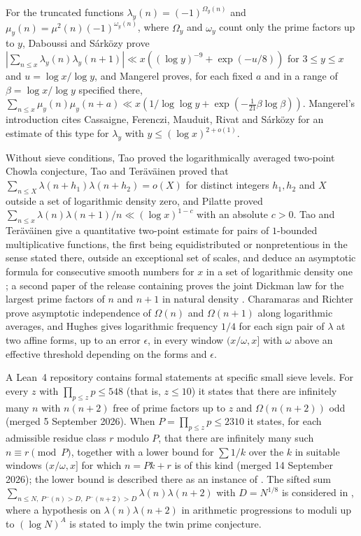 \documentclass[11pt]{article}
\theoremstyle{definition}
\theoremstyle{remark}
\numberwithin{equation}{section}
\begin{document}
For the truncated functions $\lambda_y(n)=(-1)^{\Omega_y(n)}$ and $\mu_y(n)=\mu^2(n)(-1)^{\omega_y(n)}$, where
$\Omega_y$ and $\omega_y$ count only the prime factors up to $y$, Daboussi and S\'ark\"ozy
\cite[Corollary~2]{DaboussiSarkozy2003} prove
$|\sum_{n\le x}\lambda_y(n)\lambda_y(n+1)|\ll x((\log y)^{-9}+\exp(-u/8))$ for $3\le y\le x$ and $u=\log x/\log y$,
and Mangerel \cite[Theorem~1.2(a)]{Mangerel2017} proves, for each fixed $a$ and in a range of
$\beta=\log x/\log y$ specified there,
$\sum_{n\le x}\mu_y(n)\mu_y(n+a)\ll x(1/\log\log y+\exp(-\tfrac1{21}\beta\log\beta))$. Mangerel's introduction
cites Cassaigne, Ferenczi, Mauduit, Rivat
and S\'ark\"ozy \cite{CFMRS1999} for an estimate of this type for $\lambda_y$ with $y\le(\log x)^{2+o(1)}$.

Without sieve conditions, Tao \cite[Theorem~1.2]{Tao2016} proved the logarithmically averaged two-point Chowla
conjecture, Tao and Ter\"av\"ainen \cite[Corollary~1.14]{TaoTeravainen2019} proved that
$\sum_{n\le X}\lambda(n+h_1)\lambda(n+h_2)=o(X)$ for distinct integers $h_1,h_2$ and $X$ outside a set of logarithmic density zero, and Pilatte
\cite[Theorem~1.1]{Pilatte2023} proved $\sum_{n\le x}\lambda(n)\lambda(n+1)/n\ll(\log x)^{1-c}$ with an absolute
$c>0$. Tao and Ter\"av\"ainen \cite[Theorem~3.1]{TaoTeravainen2025} give a quantitative two-point estimate for
pairs of $1$-bounded multiplicative functions, the first being equidistributed or nonpretentious in the sense stated there, outside an exceptional set of scales, and deduce an asymptotic formula for
consecutive smooth numbers for $x$ in a set of logarithmic density one \cite[Theorem~1.8]{TaoTeravainen2025}; a second paper of the release
containing \cite{OpenAI007} proves the joint Dickman law for the largest prime factors of $n$ and $n+1$ in natural density
\cite[Theorem~1.1]{OpenAI012}. Charamaras and Richter \cite[Theorem~A]{CharamarasRichter2024} prove asymptotic
independence of $\Omega(n)$ and $\Omega(n+1)$ along logarithmic averages, and Hughes
\cite[Corollary~7.1]{Hughes2026} gives logarithmic frequency $1/4$ for each sign pair of $\lambda$ at two affine
forms, up to an error $\epsilon$, in every window $(x/\omega,x]$ with $\omega$ above an effective threshold depending on the forms and $\epsilon$.

A Lean~4 repository \cite{JyhSalt2026} contains formal statements at specific small sieve levels. For every $z$
with $\prod_{p\le z}p\le548$ (that is, $z\le10$) it states that there are infinitely many $n$ with $n(n+2)$ free of
prime factors up to $z$ and $\Omega(n(n+2))$ odd (merged 5 September 2026). When $P=\prod_{p\le z}p\le2310$ it
states, for each admissible residue class $r$ modulo $P$, that there are infinitely many such $n\equiv r\pmod P$,
together with a lower bound for $\sum1/k$ over the $k$ in suitable windows $(x/\omega,x]$ for which $n=Pk+r$ is of
this kind (merged 14 September 2026); the lower bound is described there as an instance of \cite{Tao2016}. The sifted sum
$\sum_{n\le N,\ P^-(n)>D,\ P^-(n+2)>D}\lambda(n)\lambda(n+2)$ with $D=N^{1/8}$ is considered in
\cite[Section~9]{McCaffer2026}, where a hypothesis on $\lambda(n)\lambda(n+2)$ in arithmetic progressions to moduli up to $(\log N)^A$ is stated to imply the twin prime conjecture.
\end{document}
